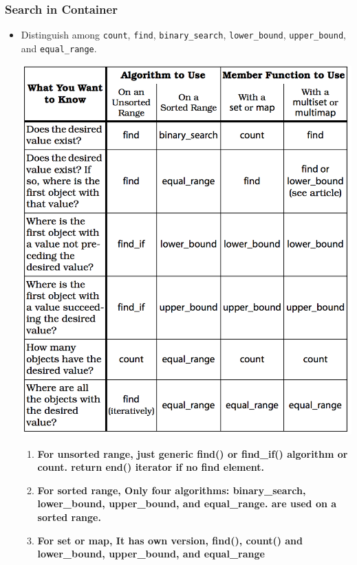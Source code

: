 \documentclass[a4paper,11pt,twoside]{book}
\begin{document}
\subsubsection{Search in Container}
\begin{itemize}
\item Distinguish among \texttt{count}, \texttt{find}, \texttt{binary\_search}, \texttt{lower\_bound}, \texttt{upper\_bound}, and \texttt{equal\_range}.

\begin{center}
	\includegraphics[scale=0.6]{pics/distinguish.png}
\end{center}

\begin{enumerate}
\item \textbf{For unsorted range, just generic find() or find\_if() algorithm or count. return end() iterator if no find element.}

\item \textbf{For sorted range, Only four algorithms: binary\_search, lower\_bound, upper\_bound, and equal\_range. are used on a sorted range.}

\item \textbf{For set or map, It has own version, find(), count() and lower\_bound, upper\_bound, and equal\_range}


\end{enumerate}
\end{itemize}
\end{document}
